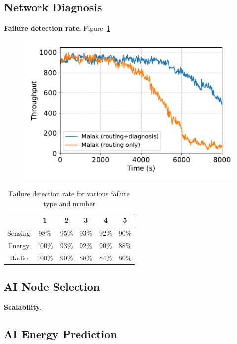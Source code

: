 \subsection{Network Diagnosis}
\textbf{Failure detection rate.}
Figure~\ref{fig:diagnosis}

\begin{figure}[htbp]
	\centering
	\includegraphics[width=.85\columnwidth]{Figure/diagnosis}
	\vspace{-0.1in}
	\caption{
		\textnormal{
		}}
	\label{fig:diagnosis}
\end{figure}

\begin{table}[htbp]
	\centering
	\caption{Failure detection rate for various failure type and number}
	\label{tab:diagnosis}
	\begin{tabular}{|c||c|c|c|c|c|}
		\hline
		\diagbox{Type}{Failures} & 1 & 2 & 3 & 4 & 5\\
		\hline
		\hline
		Sensing & 98\% & 95\% & 93\% & 92\% & 90\%\\
		\hline
		Energy & 100\% & 93\% & 92\% & 90\% & 88\%\\
		\hline
		Radio & 100\% & 90\% & 88\% & 84\% & 80\%\\
		\hline
	\end{tabular}
\end{table}

\subsection{AI Node Selection}
\textbf{Scalability.}

\subsection{AI Energy Prediction}


